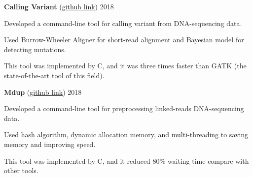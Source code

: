 

\begin{cventries}

  \cventry
    {\textbf{Calling Variant} (\href{https://github.com/tuan-tt/calling_variant}{github link})} %
    {}
    {}
    {2018} %
    {
      \begin{cvitems} %
        \item {Developed a command-line tool for calling variant from DNA-sequencing data.}
        \item {Used Burrow-Wheeler Aligner for short-read alignment and Bayesian model for detecting mutations.}
        \item {This tool was implemented by C, and it was three times faster than GATK (the state-of-the-art tool of this field).}
      \end{cvitems}
    }

  \cventry
    {\textbf{Mdup} (\href{https://github.com/kspham/mdup}{github link})} %
    {}
    {}
    {2018} %
    {
      \begin{cvitems} %
        \item {Developed a command-line tool for preprocessing linked-reads DNA-sequencing data.}
        \item {Used hash algorithm, dynamic allocation memory, and multi-threading to saving memory and improving speed.}
        \item {This tool was implemented by C, and it reduced 80\% waiting time compare with other tools.}
      \end{cvitems}
    }

\end{cventries}
